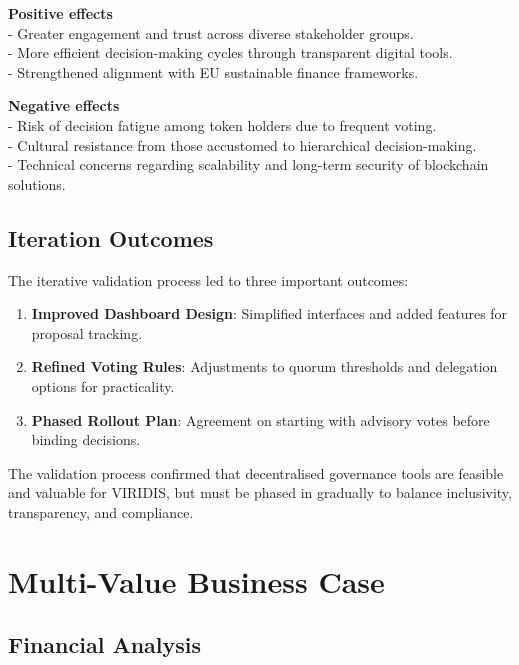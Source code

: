 \documentclass[
  english,
  12pt,
  oneside,
  open=any]{scrbook}
\providecommand{\tightlist}{%
  \setlength{\itemsep}{0pt}\setlength{\parskip}{0pt}}\usepackage{longtable,booktabs,array}
\begin{document}
\textbf{Positive effects}\\
- Greater engagement and trust across diverse stakeholder groups.\\
- More efficient decision-making cycles through transparent digital
tools.\\
- Strengthened alignment with EU sustainable finance frameworks.

\textbf{Negative effects}\\
- Risk of decision fatigue among token holders due to frequent voting.\\
- Cultural resistance from those accustomed to hierarchical
decision-making.\\
- Technical concerns regarding scalability and long-term security of
blockchain solutions.

\section{Iteration Outcomes}\label{sec-iterations}

The iterative validation process led to three important outcomes:

\begin{enumerate}
\def\labelenumi{\arabic{enumi}.}
\tightlist
\item
  \textbf{Improved Dashboard Design}: Simplified interfaces and added
  features for proposal tracking.\\
\item
  \textbf{Refined Voting Rules}: Adjustments to quorum thresholds and
  delegation options for practicality.\\
\item
  \textbf{Phased Rollout Plan}: Agreement on starting with advisory
  votes before binding decisions.
\end{enumerate}

The validation process confirmed that decentralised governance tools are
feasible and valuable for VIRIDIS, but must be phased in gradually to
balance inclusivity, transparency, and compliance.

\chapter{Multi-Value Business Case}\label{sec-business-case}

\section{Financial Analysis}\label{sec-financial}
\end{document}

